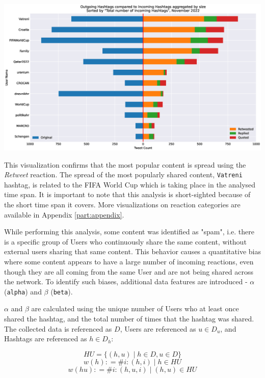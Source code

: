 \begin{center}
\includegraphics[width=16cm,keepaspectratio]{figures/hashtags-total-in-reactions.eps}
\label{figure:hashtags-total-in-reactions}
\end{center}

This visualization confirms that the most popular content is spread using the \textit{Retweet} reaction. The spread of the most popularly shared content, \texttt{Vatreni} hashtag, is related to the FIFA World Cup which is taking place in the analysed time span. It is important to note that this analysis is short-sighted because of the short time span it covers. More visualizations on reaction categories are available in Appendix \ref{part:appendix}.

While performing this analysis, some content was identified as "spam", i.e. there is a specific group of Users who continuously share the same content, without external users sharing that same content. This behavior causes a quantitative bias where some content appears to have a large number of incoming reactions, even though they are all coming from the same User and are not being shared across the network. To identify such biases, additional data features are introduced - \(\alpha\) (\texttt{alpha}) and \(\beta\) (\texttt{beta}). 

\(\alpha\) and \(\beta\) are calculated using the unique number of Users who at least once shared the hashtag, and the total number of times that the hashtag was shared. The collected data is referenced as \(D\), Users are referenced as \(u\in D_u\), and Hashtags are referenced as \(h\in D_h\):

\[
 HU = \{(h, u) \mid h \in D, u \in D\}
\]
\[
 w(h) \colon= \#{i\colon(h, i) \mid h \in HU}
\]
\[
 w(hu) \colon= \#{i\colon(h, u, i) \mid (h, u) \in HU}
\]

